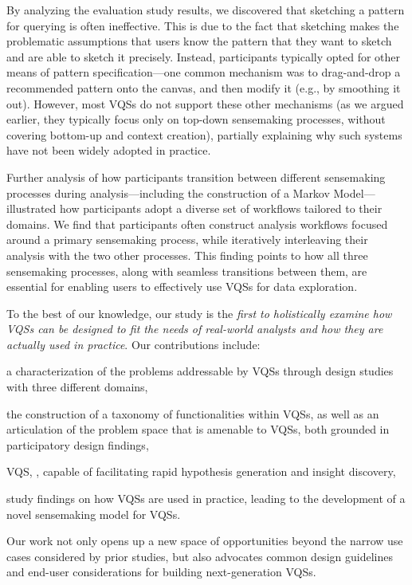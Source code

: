 \par By analyzing the evaluation study results, we discovered that sketching a pattern for querying is often ineffective. This is due to the fact that sketching makes the problematic assumptions that users know the pattern that they want to sketch and are able to sketch it precisely. Instead, participants typically opted for other means of pattern specification---one common mechanism was to drag-and-drop a recommended pattern onto the canvas, and then modify it (e.g., by smoothing it out). However, most VQSs do not support these other mechanisms (as we argued earlier, they typically focus only on top-down sensemaking processes, without covering bottom-up and context creation), partially explaining why such systems have not been widely adopted in practice.
\par Further analysis of how participants
transition between different sensemaking processes
during analysis---including the construction of a Markov Model---illustrated
how participants adopt a diverse set of workflows tailored
to their domains. We find that participants often construct analysis workflows focused around a primary sensemaking process, while iteratively interleaving their analysis with the two other processes. This finding points to how all three sensemaking processes, along with seamless transitions between them, are essential for enabling users to effectively use VQSs for data exploration.%
\par To the best of our knowledge, our study is the \emph{first to holistically examine how VQSs can be designed to fit the needs of real-world
analysts and how they are actually used in practice}. Our contributions include:
\begin{denselist}
\item a characterization of the problems addressable by VQSs through design studies with three different domains,
\item the construction of a taxonomy of functionalities within VQSs, as well as an articulation of the problem space that is amenable to VQSs, both grounded in participatory design findings,
\item {} VQS, \zvpp, capable of facilitating rapid hypothesis generation and insight discovery,
\item study findings on how VQSs are used in practice, leading to the development of a novel sensemaking model for VQSs. %
\end{denselist}
Our work not only opens up a new space of opportunities beyond the narrow use cases considered by prior studies, but also advocates common design guidelines and end-user considerations for building next-generation VQSs.

